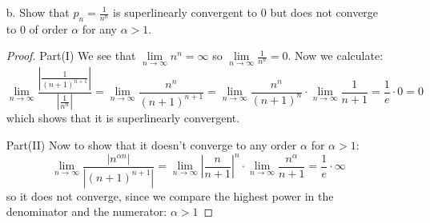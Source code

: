 \documentclass{article}
\begin{document}
\begin{itemize}
        \item [b.] Show that $p_{n} = \frac{1}{n^{n}}$ is superlinearly convergent to $0$ but does not converge to $0$ of order $\alpha$ for any $\alpha > 1$.
            \begin{proof}
                Part(I) We see that $\lim\limits_{n \to \infty} n^{n} = \infty$ so $\lim\limits_{n \to \infty} \frac{1}{n^{n}} = 0$. Now we calculate:
                    \begin{equation*}
                        \lim\limits_{n \to \infty} \dfrac{\left\lvert \frac{1}{(n + 1)^{n + 1}} \right\rvert}{\left\lvert \frac{1}{n^{n}} \right\rvert} = \lim\limits_{n \to  \infty} \dfrac{n^{n}}{(n + 1)^{n + 1}} = \lim\limits_{n \to \infty} \dfrac{n^{n}}{(n + 1)^{n}} \cdot \lim\limits_{n \to \infty} \dfrac{1}{n + 1} = \dfrac{1}{e} \cdot 0 = 0
                    \end{equation*}
                which shows that it is superlinearly convergent.

                Part(II) Now to show that it doesn't converge to any order $\alpha$ for $\alpha > 1$:
                    \begin{equation*}
                        \lim\limits_{n \to \infty} \dfrac{\left\lvert n^{\alpha n} \right\rvert}{\left\lvert (n + 1)^{n + 1} \right\rvert} = \lim\limits_{n \to \infty} \left\lvert \dfrac{n}{n + 1} \right\rvert^{n} \cdot \lim\limits_{n \to \infty} \dfrac{n^{\alpha}}{n + 1} = \dfrac{1}{e} \cdot \infty
                    \end{equation*}
                so it does not converge, since we compare the highest power in the denominator and the numerator: $\alpha > 1$
            \end{proof}
    \end{itemize}
\end{document}
